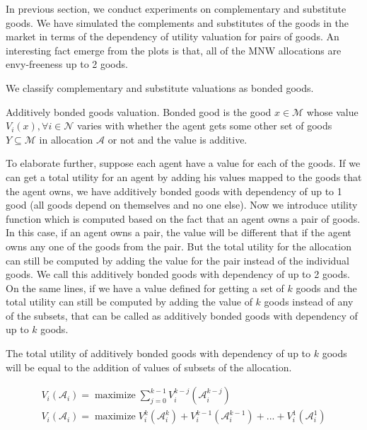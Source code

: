 In previous section, we conduct experiments on complementary and substitute goods. We have simulated the complements and substitutes of the goods in the market in terms of the dependency of utility valuation for pairs of goods. An interesting fact emerge from the plots is that, all of the MNW allocations are envy-freeness up to 2 goods.

We classify complementary and substitute valuations as bonded goods.

\begin{definition}{Additively bonded goods valuation.}
Bonded good is the good $x \in \mathcal{M}$ whose value $V_i(x), \forall i \in \mathcal{N}$ varies with whether the agent gets some other set of goods $Y \subseteq \mathcal{M}$ in allocation $\mathcal{A}$ or not and the value is additive.
\end{definition}

To elaborate further, suppose each agent have a value for each of the goods. If we can get a total utility for an agent by adding his values mapped to the goods that the agent owns, we have additively bonded goods with dependency of up to 1 good (all goods depend on themselves and no one else). Now we introduce utility function which is computed based on the fact that an agent owns a pair of goods. In this case, if an agent owns a pair, the value will be different that if the agent owns any one of the goods from the pair. But the total utility for the allocation can still be computed by adding the value for the pair instead of the individual goods. We call this additively bonded goods with dependency of up to 2 goods. On the same lines, if we have a value defined for getting a set of $k$ goods and the total utility can still be computed by adding the value of $k$ goods instead of any of the subsets, that can be called as additively bonded goods with dependency of up to $k$ goods.

The total utility of additively bonded goods with dependency of up to $k$ goods will be equal to the addition of values of subsets of the allocation.

\begin{equation}
\label{eq_abgv}
\begin{gathered}
    V_i(\mathcal{A}_i) = \operatorname{maximize} \sum_{j=0}^{k-1} V^{k-j}_i(\mathcal{A}^{k-j}_i) \\
    V_i(\mathcal{A}_i) = \operatorname{maximize} V^k_i(\mathcal{A}^k_i) + V^{k-1}_i(\mathcal{A}^{k-1}_i) + ... + V^1_i(\mathcal{A}^{1}_i)
\end{gathered}
\end{equation}

